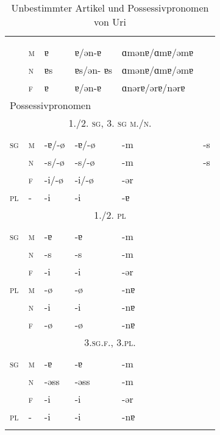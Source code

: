 \begin{table}[H]
	\caption{Unbestimmter Artikel und Possessivpronomen von Uri \citep[189, 193-194]{Clauß1929}}\label{table108}
	\begin{tabular}{llllll}
		\lsptoprule
		\multicolumn{6}{l}{unbestimmter Artikel} \\
		&  & \NOM & \AKK & \DAT & \\\midrule
		& \textsc{m} & ɐ & ɐ/ən-ɐ & \mbox{ɑmənɐ/ɑmɐ/əmɐ} & \\
		& \textsc{n} & ɐs & ɐs/ən- ɐs & \mbox{ɑmənɐ/ɑmɐ/əmɐ} & \\
		& \textsc{f} & ɐ & ɐ/ən-ɐ & \mbox{ɑnərɐ/ərɐ/nərɐ} & \\ \midrule
		\multicolumn{6}{l}{Possessivpronomen}  \\
		\multicolumn{6}{c}{\scshape 1./2. \textsc{sg}, 3. \textsc{sg} m./n.} \\\cmidrule(lr){1-6}
		&  & \NOM & \AKK & \DAT & \GEN\\\midrule
		\textsc{sg} & \textsc{m} & {}-ɐ/-ø & {}-ɐ/-ø & {}-m & {}-s\\
		& \textsc{n} & {}-s/-ø & {}-s/-ø & {}-m & {}-s\\
		& \textsc{f} & {}-i/-ø & {}-i/-ø & {}-ər & \\
		\textsc{pl} & - & {}-i & {}-i & {}-ɐ & \\ \midrule
		\multicolumn{6}{c}{\scshape 1./2. \textsc{pl}} \\\cmidrule(lr){1-6}
		&  & \NOM & \AKK & \DAT & \\\midrule
		\textsc{sg} & \textsc{m} & {}-ɐ & {}-ɐ & {}-m & \\
		& \textsc{n} & {}-s & {}-s & {}-m & \\
		& \textsc{f} & {}-i & {}-i & {}-ər & \\
		\textsc{pl} & \textsc{m} & {}-ø & {}-ø & {}-nɐ & \\
		& \textsc{n} & {}-i & {}-i & {}-nɐ & \\
		& \textsc{f} & {}-ø & {}-ø & {}-nɐ & \\ \midrule
		\multicolumn{6}{c}{\scshape 3.sg.f., 3.pl.} \\\cmidrule(lr){1-6}
		&  & \NOM & \AKK & \DAT & \\\midrule
		\textsc{sg} & \textsc{m} & {}-ɐ & {}-ɐ & {}-m & \\
		& \textsc{n} & {}-əss & {}-əss & {}-m & \\
		& \textsc{f} & {}-i & {}-i & {}-ər & \\
		\textsc{pl} & - & {}-i & {}-i & {}-nɐ & \\
		\lspbottomrule
	\end{tabular}
\end{table}


